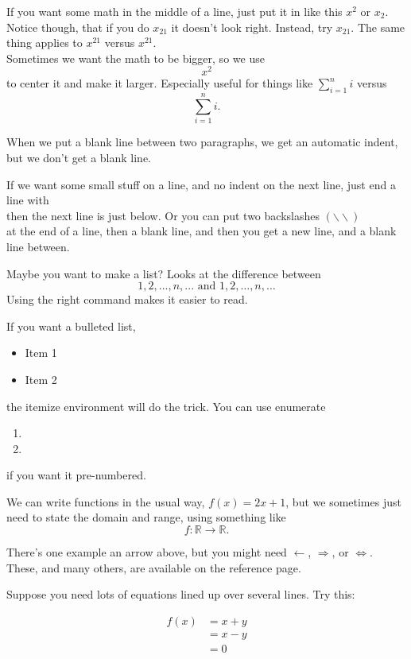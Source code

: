 \documentclass[12 pt]{article}
\theoremstyle{definition}
\newcommand{\R}{\mathbb{R}}
\begin{document}
If you want some math in the middle of a line, just put it in like this $x^2$ or $x_2$. Notice though, that if you do $x_21$ it doesn't look right. Instead, try $x_{21}$. The same thing applies to $x^21$ versus $x^{21}$.\\

Sometimes we want the math to be bigger, so we use $$x^2$$ to center it and make it larger. Especially useful for things like $\sum_{i=1}^n i$ versus $$\sum_{i=1}^n i.$$

When we put a blank line between two paragraphs, we get an automatic indent, but we don't get a blank line.

If we want some small stuff on a line, and no indent on the next line, just end a line with \\
then the next line is just below. Or you can put two backslashes $(\backslash\backslash)$ \\

at the end of a line, then a blank line, and then you get a new line, and a blank line between.

Maybe you want to make a list? Looks at the difference between 
$$1,2,...,n,... \mbox{ and } 1,2,\ldots,n,\ldots$$
Using the right command makes it easier to read.

If you want a bulleted list,
\begin{itemize}
\item Item 1
\item Item 2
\end{itemize}
the itemize environment will do the trick. You can use enumerate
\begin{enumerate}
\item
\item
\end{enumerate}
if you want it pre-numbered.

We can write functions in the usual way, $f(x) = 2x +1$, but we sometimes just need to state the domain and range, using something like $$f: \R \rightarrow \R.$$

There's one example an arrow above, but you might need $\leftarrow$, $\Rightarrow$, or $\iff$. These, and many others, are available on the reference page.

Suppose you need lots of equations lined up over several lines. Try this:

\begin{align*}
f(x) &= x+y\\
&= x-y\\
&=0
\end{align*}
\end{document}
